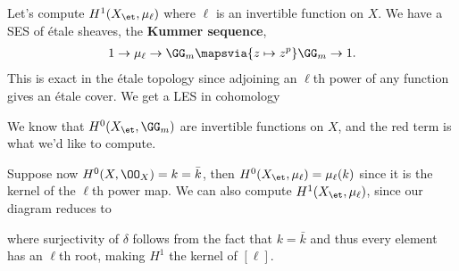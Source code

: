 \begin{example}[?]

Let's compute \(H^1(X_\et, \mu_\ell)\) where \(\ell\) is an invertible
function on \(X\). We have a SES of étale sheaves, the \textbf{Kummer
sequence},
\begin{align*}  
1 \to \mu_\ell \to \GG_m \mapsvia{z\mapsto z^p} \GG_m \to 1
.\end{align*} This is exact in the étale topology since adjoining an
\(\ell\)th power of any function gives an étale cover. We get a LES in
cohomology

\begin{center}
\end{center}

We know that \(H^0(X_\et, \GG_m)\) are invertible functions on \(X\),
and the red term is what we'd like to compute.

Suppose now \(H^0(X, \OO_X) = k = \bar k\), then
\(H^0(X_\et,\mu_\ell) = \mu_\ell(k)\) since it is the kernel of the
\(\ell\)th power map. We can also compute \(H^1(X_\et, \mu_\ell)\),
since our diagram reduces to

\begin{center}
\end{center}

where surjectivity of \(\delta\) follows from the fact that \(k=\bar k\)
and thus every element has an \(\ell\)th root, making \(H^1\) the kernel
of \([\ell]\).

\end{example}

